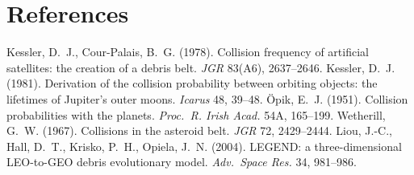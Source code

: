 \documentclass[11pt,a4paper]{article}
\begin{document}
\section*{References}

Kessler, D.~J., Cour-Palais, B.~G. (1978). Collision frequency of artificial
satellites: the creation of a debris belt. \emph{JGR} 83(A6), 2637--2646.
\quad
Kessler, D.~J. (1981). Derivation of the collision probability between orbiting
objects: the lifetimes of Jupiter's outer moons. \emph{Icarus} 48, 39--48.
\quad
\"Opik, E.~J. (1951). Collision probabilities with the planets. \emph{Proc.~R.
Irish Acad.} 54A, 165--199.
\quad
Wetherill, G.~W. (1967). Collisions in the asteroid belt. \emph{JGR} 72, 2429--2444.
\quad
Liou, J.-C., Hall, D.~T., Krisko, P.~H., Opiela, J.~N. (2004). LEGEND: a
three-dimensional LEO-to-GEO debris evolutionary model. \emph{Adv.~Space Res.}
34, 981--986.
\end{document}
